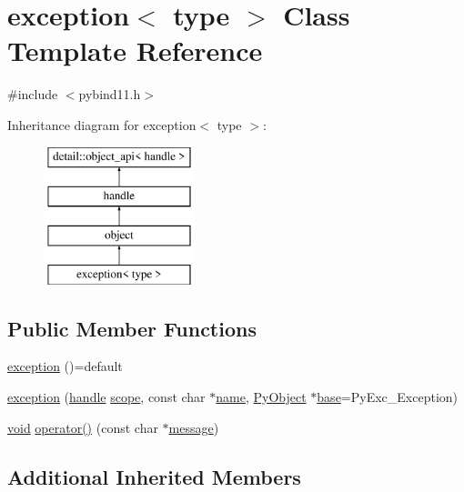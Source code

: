 \hypertarget{classexception}{}\section{exception$<$ type $>$ Class Template Reference}
\label{classexception}


{\ttfamily \#include $<$pybind11.\+h$>$}

Inheritance diagram for exception$<$ type $>$\+:\begin{figure}[H]
\begin{center}
\leavevmode
\includegraphics[height=4.000000cm]{classexception}
\end{center}
\end{figure}
\subsection*{Public Member Functions}
\begin{DoxyCompactItemize}
\item 
\mbox{\hyperlink{classexception_a54c9f127e402c9656e66514d1a977448}{exception}} ()=default
\item 
\mbox{\hyperlink{classexception_a34fc75a5802151fdc02549ad85f81b7f}{exception}} (\mbox{\hyperlink{classhandle}{handle}} \mbox{\hyperlink{structscope}{scope}}, const char $\ast$\mbox{\hyperlink{structname}{name}}, \mbox{\hyperlink{_python27_2object_8h_aadc84ac7aed2cfa6f20c25f62bf3dac7}{Py\+Object}} $\ast$\mbox{\hyperlink{structbase}{base}}=Py\+Exc\+\_\+\+Exception)
\item 
\mbox{\hyperlink{_s_d_l__opengles2__gl2ext_8h_ae5d8fa23ad07c48bb609509eae494c95}{void}} \mbox{\hyperlink{classexception_ac9b98aed26c8e302721614222245da93}{operator()}} (const char $\ast$\mbox{\hyperlink{_s_d_l__opengl__glext_8h_a7b6161cffb9b8aee272b3b916183d28c}{message}})
\end{DoxyCompactItemize}
\subsection*{Additional Inherited Members}


